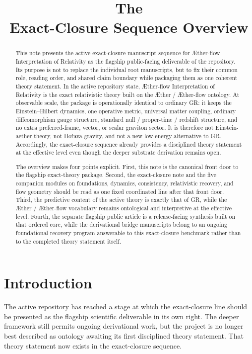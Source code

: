 \documentclass[11pt]{article}
\title{\textbf{The \TheoryName{}}\\[0.4em]
\large Exact-Closure Sequence Overview}
\author{}
\date{}
\newcommand{\Aether}{\AE{}ther}
\newcommand{\Aflow}{\AE{}ther-flow}
\newcommand{\TheoryName}{\Aflow{} Interpretation of Relativity}
\begin{document}
\maketitle

\begin{abstract}
This note presents the active exact-closure manuscript sequence for \TheoryName{} as the flagship public-facing deliverable of the repository. Its purpose is not to replace the individual root manuscripts, but to fix their common role, reading order, and shared claim boundary while packaging them as one coherent theory statement. In the active repository state, \TheoryName{} is the exact relativistic theory built on the \Aether{} / \Aflow{} ontology. At observable scale, the package is operationally identical to ordinary GR: it keeps the Einstein--Hilbert dynamics, one operative metric, universal matter coupling, ordinary diffeomorphism gauge structure, standard null / proper-time / redshift structure, and no extra preferred-frame, vector, or scalar graviton sector. It is therefore not Einstein-aether theory, not Ho\v{r}ava gravity, and not a new low-energy alternative to GR. Accordingly, the exact-closure sequence already provides a disciplined theory statement at the effective level even though the deeper substrate derivation remains open.

The overview makes four points explicit. First, this note is the canonical front door to the flagship exact-theory package. Second, the exact-closure note and the five companion modules on foundations, dynamics, consistency, relativistic recovery, and flow geometry should be read as one fixed coordinated line after that front door. Third, the predictive content of the active theory is exactly that of GR, while the \Aether{} / \Aflow{} vocabulary remains ontological and interpretive at the effective level. Fourth, the separate flagship public article is a release-facing synthesis built on that ordered core, while the derivational bridge manuscripts belong to an ongoing foundational recovery program answerable to this exact-closure benchmark rather than to the completed theory statement itself.
\end{abstract}

\section{Introduction}

The active repository has reached a stage at which the exact-closure line should be presented as the flagship scientific deliverable in its own right. The deeper framework still permits ongoing derivational work, but the project is no longer best described as ontology awaiting its first disciplined theory statement. That theory statement now exists in the exact-closure sequence.
\end{document}
